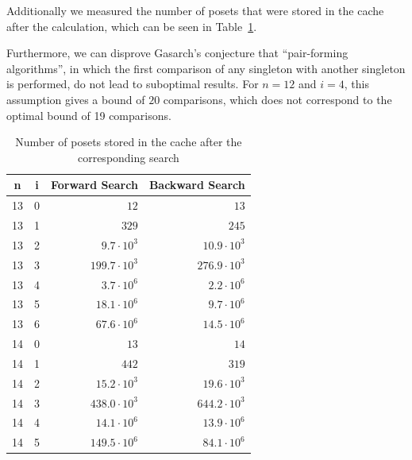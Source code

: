 \documentclass[10pt,journal,compsoc]{IEEEtran}
\begin{document}
Additionally we measured the number of posets that were stored in the cache after the calculation, which can be seen in Table~\ref{table:cache_entries}.

Furthermore, we can disprove Gasarch's \cite{Gasarch1996} conjecture that ``pair-forming algorithms'', in which the first comparison of any singleton with another singleton is performed, do not lead to suboptimal results.
For $n = 12$ and $i = 4$, this assumption gives a bound of $20$ comparisons, which does not correspond to the optimal bound of 19 comparisons.

\begin{table}[!t]
  \renewcommand{\arraystretch}{1.2}
  \caption{Number of posets stored in the cache after the corresponding search}
  \label{table:cache_entries}
  \centering
  \begin{tabular}{c|c|r|r}
    \textbf{n} & \textbf{i} & \textbf{Forward Search} & \textbf{Backward Search} \\
    \hline
    13         & 0          & $12$                    & $13$                     \\
    13         & 1          & $329$                   & $245$                    \\
    13         & 2          & $9.7 \cdot 10^3$        & $10.9 \cdot 10^3$        \\
    13         & 3          & $199.7 \cdot 10^3$      & $276.9 \cdot 10^3$       \\
    13         & 4          & $3.7 \cdot 10^6$        & $2.2 \cdot 10^6$         \\
    13         & 5          & $18.1 \cdot 10^6$       & $9.7 \cdot 10^6$         \\
    13         & 6          & $67.6 \cdot 10^6$       & $14.5 \cdot 10^6$        \\
    \hline
    14         & 0          & $13$                    & $14$                     \\
    14         & 1          & $442$                   & $319$                    \\
    14         & 2          & $15.2 \cdot 10^3$       & $19.6 \cdot 10^3$        \\
    14         & 3          & $438.0 \cdot 10^3$      & $644.2 \cdot 10^3$       \\
    14         & 4          & $14.1 \cdot 10^6$       & $13.9 \cdot 10^6$        \\
    14         & 5          & $149.5 \cdot 10^6$      & $84.1 \cdot 10^6$        \\

\end{tabular}
\end{table}
\end{document}
